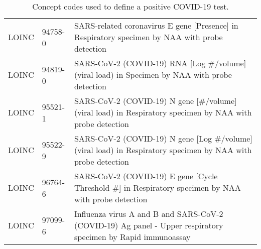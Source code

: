 \begin{table}[ht]
\begin{tabular}{lll}
  LOINC & 94758-0 & SARS-related coronavirus E gene [Presence] in Respiratory specimen by NAA with probe detection \\ 
  LOINC & 94819-0 & SARS-CoV-2 (COVID-19) RNA [Log \#/volume] (viral load) in Specimen by NAA with probe detection \\ 
  LOINC & 95521-1 & SARS-CoV-2 (COVID-19) N gene [\#/volume] (viral load) in Respiratory specimen by NAA with probe detection \\ 
  LOINC & 95522-9 & SARS-CoV-2 (COVID-19) N gene [Log \#/volume] (viral load) in Respiratory specimen by NAA with probe detection \\ 
  LOINC & 96764-6 & SARS-CoV-2 (COVID-19) E gene [Cycle Threshold \#] in Respiratory specimen by NAA with probe detection \\ 
  LOINC & 97099-6 & Influenza virus A and B and SARS-CoV-2 (COVID-19) Ag panel - Upper respiratory specimen by Rapid immunoassay \\ 
   \hline
\end{tabular}
\caption{Concept codes used to define a positive COVID-19 test.} 
\label{tab:codes_positive_test}
\end{table}
